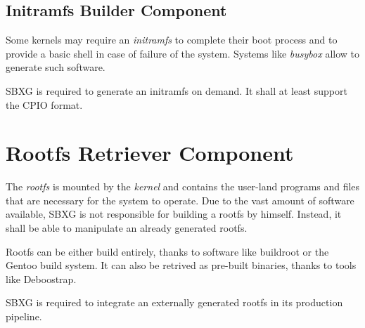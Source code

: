 \documentclass{article}
\begin{document}
\subsection{Initramfs Builder Component}

Some kernels may require an \emph{initramfs} to complete their boot process and
to provide a basic shell in case of failure of the system. Systems like
\emph{busybox} allow to generate such software.

\begin{requirement}
SBXG is required to generate an initramfs on demand. It shall at least support
the CPIO format.
\end{requirement}

\begin{center}
\end{center}

\section{Rootfs Retriever Component}

The \emph{rootfs} is mounted by the \emph{kernel} and contains the user-land
programs and files that are necessary for the system to operate. Due to the vast
amount of software available, SBXG is not responsible for building a rootfs by
himself. Instead, it shall be able to manipulate an already generated rootfs.

Rootfs can be either build entirely, thanks to software like buildroot or the
Gentoo build system. It can also be retrived as pre-built binaries, thanks to
tools like Deboostrap.

\begin{requirement}
SBXG is required to integrate an externally generated rootfs in its production
pipeline.
\end{requirement}
\end{document}
